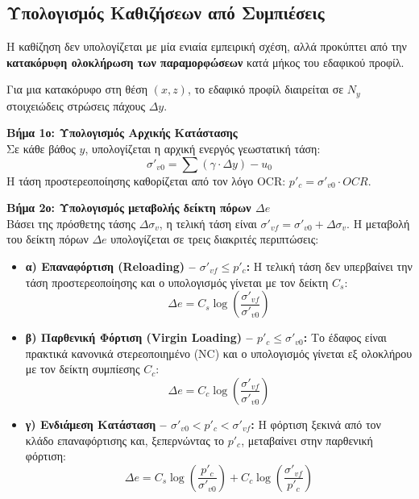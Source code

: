 \documentclass[11pt,a4paper]{article}
\begin{document}
\subsection{Υπολογισμός Καθιζήσεων από Συμπιέσεις}

Η καθίζηση δεν υπολογίζεται με μία ενιαία εμπειρική σχέση, αλλά προκύπτει από την \textbf{κατακόρυφη ολοκλήρωση των παραμορφώσεων} κατά μήκος του εδαφικού προφίλ.

Για μια κατακόρυφο στη θέση $(x,z)$, το εδαφικό προφίλ διαιρείται σε $N_y$ στοιχειώδεις στρώσεις πάχους $\Delta y$.

\textbf{Βήμα 1ο: Υπολογισμός Αρχικής Κατάστασης}\\
Σε κάθε βάθος $y$, υπολογίζεται η αρχική ενεργός γεωστατική τάση:
\begin{equation}
  \sigma'_{v0} = \sum(\gamma\cdot\Delta y) - u_0
\end{equation}
Η τάση προστερεοποίησης καθορίζεται από τον λόγο OCR: $p'_c = \sigma'_{v0}\cdot OCR$.

\textbf{Βήμα 2ο: Υπολογισμός μεταβολής δείκτη πόρων $\Delta e$}\\
Βάσει της πρόσθετης τάσης $\Delta\sigma_v$, η τελική τάση είναι $\sigma'_{vf} = \sigma'_{v0} + \Delta\sigma_v$. Η μεταβολή του δείκτη πόρων $\Delta e$ υπολογίζεται σε τρεις διακριτές περιπτώσεις:
\begin{itemize}
  \item \textbf{α) Επαναφόρτιση (Reloading) -- $\sigma'_{vf} \le p'_c$:} Η τελική τάση δεν υπερβαίνει την τάση προστερεοποίησης και ο υπολογισμός γίνεται με τον δείκτη $C_s$:
  \begin{equation}\label{eq:reload}
    \Delta e = C_s \log\left(\frac{\sigma'_{vf}}{\sigma'_{v0}}\right)
  \end{equation}
  \item \textbf{β) Παρθενική Φόρτιση (Virgin Loading) -- $p'_c \le \sigma'_{v0}$:} Το έδαφος είναι πρακτικά κανονικά στερεοποιημένο (NC) και ο υπολογισμός γίνεται εξ ολοκλήρου με τον δείκτη συμπίεσης $C_c$:
  \begin{equation}
    \Delta e = C_c \log\left(\frac{\sigma'_{vf}}{\sigma'_{v0}}\right)
  \end{equation}
  \item \textbf{γ) Ενδιάμεση Κατάσταση -- $\sigma'_{v0} < p'_c < \sigma'_{vf}$:} Η φόρτιση ξεκινά από τον κλάδο επαναφόρτισης και, ξεπερνώντας το $p'_c$, μεταβαίνει στην παρθενική φόρτιση:
  \begin{equation}\label{eq:mixed}
    \Delta e = C_s \log\left(\frac{p'_c}{\sigma'_{v0}}\right) + C_c \log\left(\frac{\sigma'_{vf}}{p'_c}\right)
  \end{equation}
\end{itemize}
\end{document}
